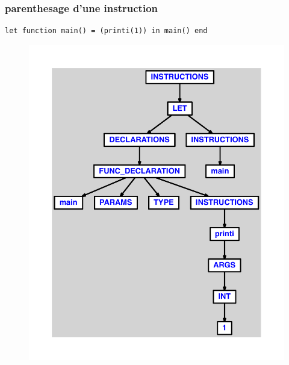 \documentclass{article}
\begin{document}
\subsubsection{parenthesage d'une instruction}
\begin{lstlisting}
let function main() = (printi(1)) in main() end
\end{lstlisting}
\newpage
\begin{figure}[H]
\centering
\includegraphics[max width=\textwidth]{ast/ast_135.pdf}
\end{figure}
\newpage
\end{document}
